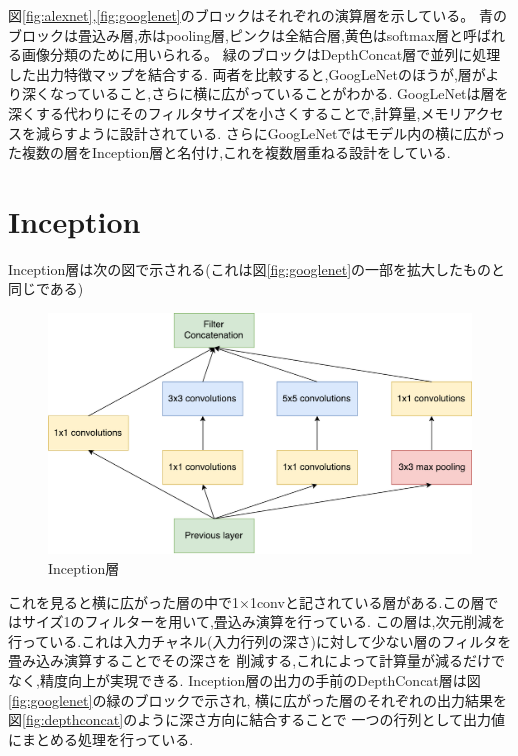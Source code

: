 {図\ref{fig:alexnet},\ref{fig:googlenet}のブロックはそれぞれの演算層を示している。
青のブロックは畳込み層,赤はpooling層,ピンクは全結合層,黄色はsoftmax層と呼ばれる画像分類のために用いられる。
緑のブロックはDepthConcat層で並列に処理した出力特徴マップを結合する.
両者を比較すると,GoogLeNetのほうが,層がより深くなっていること,さらに横に広がっていることがわかる.
GoogLeNetは層を深くする代わりにそのフィルタサイズを小さくすることで,計算量,メモリアクセスを減らすように設計されている.
さらにGoogLeNetではモデル内の横に広がった複数の層をInception層と名付け,これを複数層重ねる設計をしている.

\section{Inception}
\label{sec:inception}
Inception層は次の図で示される(これは図\ref{fig:googlenet}の一部を拡大したものと同じである)

\begin{figure}[h]
  \centering
  \includegraphics[scale=0.5]{./chap2/fig/inception.pdf}
  \caption{Inception層}
  \label{fig:inception}
\end{figure}

これを見ると横に広がった層の中で1$\times$1convと記されている層がある.この層ではサイズ1のフィルターを用いて,畳込み演算を行っている.
この層は,次元削減を行っている.これは入力チャネル(入力行列の深さ)に対して少ない層のフィルタを畳み込み演算することでその深さを
削減する,これによって計算量が減るだけでなく,精度向上が実現できる.
Inception層の出力の手前のDepthConcat層は図\ref{fig:googlenet}の緑のブロックで示され,
横に広がった層のそれぞれの出力結果を図\ref{fig:depthconcat}のように深さ方向に結合することで
一つの行列として出力値にまとめる処理を行っている.

}
